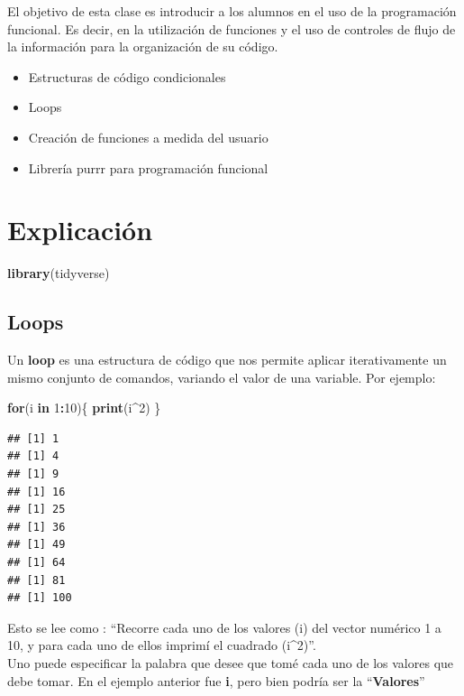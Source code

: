 \documentclass[]{book}
\newenvironment{Shaded}{\begin{snugshade}}{\end{snugshade}}
\newcommand{\ControlFlowTok}[1]{\textcolor[rgb]{0.13,0.29,0.53}{\textbf{#1}}}
\newcommand{\DecValTok}[1]{\textcolor[rgb]{0.00,0.00,0.81}{#1}}
\newcommand{\KeywordTok}[1]{\textcolor[rgb]{0.13,0.29,0.53}{\textbf{#1}}}
\newcommand{\NormalTok}[1]{#1}
\newcommand{\OperatorTok}[1]{\textcolor[rgb]{0.81,0.36,0.00}{\textbf{#1}}}
\providecommand{\tightlist}{%
  \setlength{\itemsep}{0pt}\setlength{\parskip}{0pt}}
\begin{document}
El objetivo de esta clase es introducir a los alumnos en el uso de la programación funcional. Es decir, en la utilización de funciones y el uso de controles de flujo de la información para la organización de su código.

\begin{itemize}
\tightlist
\item
  Estructuras de código condicionales
\item
  Loops
\item
  Creación de funciones a medida del usuario
\item
  Librería purrr para programación funcional
\end{itemize}

\hypertarget{explicacion-1}{%
\section{Explicación}\label{explicacion-1}}

\begin{Shaded}
\begin{Highlighting}[]
\KeywordTok{library}\NormalTok{(tidyverse)}
\end{Highlighting}
\end{Shaded}

\hypertarget{loops}{%
\subsection{Loops}\label{loops}}

Un \textbf{loop} es una estructura de código que nos permite aplicar iterativamente un mismo conjunto de comandos, variando el valor de una variable. Por ejemplo:

\begin{Shaded}
\begin{Highlighting}[]
\ControlFlowTok{for}\NormalTok{(i }\ControlFlowTok{in} \DecValTok{1}\OperatorTok{:}\DecValTok{10}\NormalTok{)\{}
   \KeywordTok{print}\NormalTok{(i}\OperatorTok{^}\DecValTok{2}\NormalTok{)}
\NormalTok{\}}
\end{Highlighting}
\end{Shaded}

\begin{verbatim}
## [1] 1
## [1] 4
## [1] 9
## [1] 16
## [1] 25
## [1] 36
## [1] 49
## [1] 64
## [1] 81
## [1] 100
\end{verbatim}

Esto se lee como : ``Recorre cada uno de los valores (i) del vector numérico 1 a 10, y para cada uno de ellos imprimí el cuadrado (i\^{}2)''.\\
Uno puede especificar la palabra que desee que tomé cada uno de los valores que debe tomar. En el ejemplo anterior fue \textbf{i}, pero bien podría ser la ``\textbf{Valores}''
\end{document}
